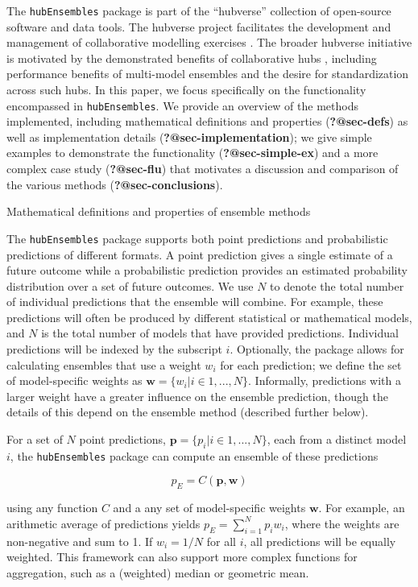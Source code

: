 \documentclass[
  article,
  shortnames,
  notitle]{jss}
\begin{document}
The \texttt{hubEnsembles} package is part of the ``hubverse'' collection
of open-source software and data tools. The hubverse project facilitates
the development and management of collaborative modelling exercises
\citep{hubverse_docs}. The broader hubverse initiative is motivated by
the demonstrated benefits of collaborative hubs
\citep{reich2022, borchering_public_2023}, including performance
benefits of multi-model ensembles and the desire for standardization
across such hubs. In this paper, we focus specifically on the
functionality encompassed in \texttt{hubEnsembles}. We provide an
overview of the methods implemented, including mathematical definitions
and properties (\textbf{?@sec-defs}) as well as implementation details
(\textbf{?@sec-implementation}); we give simple examples to demonstrate
the functionality (\textbf{?@sec-simple-ex}) and a more complex case
study (\textbf{?@sec-flu}) that motivates a discussion and comparison of
the various methods (\textbf{?@sec-conclusions}).

Mathematical definitions and properties of ensemble methods

The \texttt{hubEnsembles} package supports both point predictions and
probabilistic predictions of different formats. A point prediction gives
a single estimate of a future outcome while a probabilistic prediction
provides an estimated probability distribution over a set of future
outcomes. We use \(N\) to denote the total number of individual
predictions that the ensemble will combine. For example, these
predictions will often be produced by different statistical or
mathematical models, and \(N\) is the total number of models that have
provided predictions. Individual predictions will be indexed by the
subscript \(i\). Optionally, the package allows for calculating
ensembles that use a weight \(w_i\) for each prediction; we define the
set of model-specific weights as
\(\pmb{w} = \{w_i | i \in 1, ..., N\}\). Informally, predictions with a
larger weight have a greater influence on the ensemble prediction,
though the details of this depend on the ensemble method (described
further below).

For a set of \(N\) point predictions,
\(\pmb{p} = \{p_i|i \in 1, ..., N\}\), each from a distinct model \(i\),
the \texttt{hubEnsembles} package can compute an ensemble of these
predictions

\[
p_E = C(\pmb{p}, \pmb{w}) 
\]

using any function \(C\) and a any set of model-specific weights
\(\pmb{w}\). For example, an arithmetic average of predictions yields
\(p_E = \sum_{i=1}^Np_iw_i\), where the weights are non-negative and sum
to 1. If \(w_i = 1/N\) for all \(i\), all predictions will be equally
weighted. This framework can also support more complex functions for
aggregation, such as a (weighted) median or geometric mean.
\end{document}
